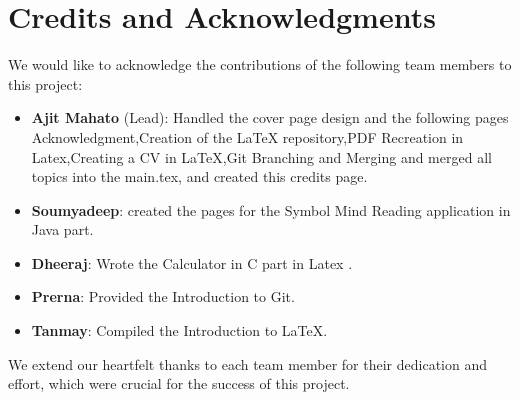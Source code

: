 \section*{Credits and Acknowledgments}

We would like to acknowledge the contributions of the following team members to this project:

\begin{itemize}
    \item \textbf{Ajit Mahato} (Lead): Handled the cover page design and the following pages Acknowledgment,Creation of the LaTeX repository,PDF Recreation in Latex,Creating a CV in LaTeX,Git Branching and Merging and merged all topics into the main.tex, and created this credits page.
    \item \textbf{Soumyadeep}: created the pages for the Symbol Mind Reading application in Java part.
    \item \textbf{Dheeraj}: Wrote the Calculator in C part in Latex .
    \item \textbf{Prerna}: Provided the Introduction to Git.
    \item \textbf{Tanmay}: Compiled the Introduction to LaTeX.
\end{itemize}

We extend our heartfelt thanks to each team member for their dedication and effort, which were crucial for the success of this project.
